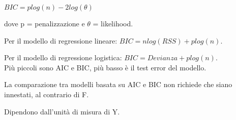 $BIC = plog(n) - 2log(\theta)$

dove p = penalizzazione e $\theta$ = likelihood.

Per il modello di regressione lineare: $BIC = nlog(RSS) + plog(n)$.

Per il modello di regressione logistica: $BIC = Devianza + plog(n)$.\\

Più piccoli sono AIC e BIC, più basso è il test error del modello.

La comparazione tra modelli basata su AIC e BIC non richiede che siano
innestati, al contrario di F.

Dipendono dall'unità di misura di Y.






